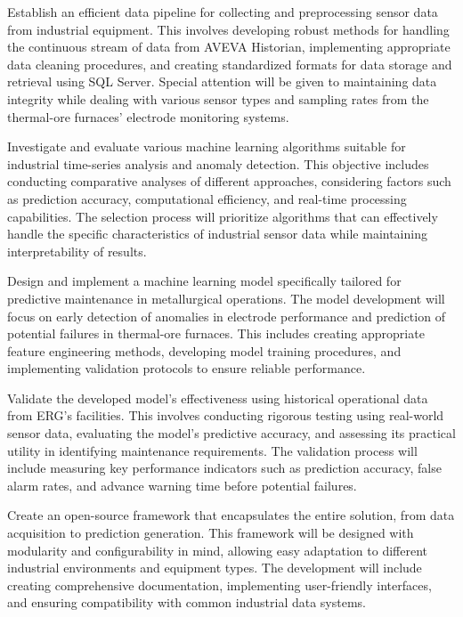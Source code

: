 Establish an efficient data pipeline for collecting and preprocessing sensor data from industrial equipment. This involves developing robust methods for handling the continuous stream of data from AVEVA Historian, implementing appropriate data cleaning procedures, and creating standardized formats for data storage and retrieval using SQL Server. Special attention will be given to maintaining data integrity while dealing with various sensor types and sampling rates from the thermal-ore furnaces' electrode monitoring systems.

Investigate and evaluate various machine learning algorithms suitable for industrial time-series analysis and anomaly detection. This objective includes conducting comparative analyses of different approaches, considering factors such as prediction accuracy, computational efficiency, and real-time processing capabilities. The selection process will prioritize algorithms that can effectively handle the specific characteristics of industrial sensor data while maintaining interpretability of results.

Design and implement a machine learning model specifically tailored for predictive maintenance in metallurgical operations. The model development will focus on early detection of anomalies in electrode performance and prediction of potential failures in thermal-ore furnaces. This includes creating appropriate feature engineering methods, developing model training procedures, and implementing validation protocols to ensure reliable performance.

Validate the developed model's effectiveness using historical operational data from ERG's facilities. This involves conducting rigorous testing using real-world sensor data, evaluating the model's predictive accuracy, and assessing its practical utility in identifying maintenance requirements. The validation process will include measuring key performance indicators such as prediction accuracy, false alarm rates, and advance warning time before potential failures.

Create an open-source framework that encapsulates the entire solution, from data acquisition to prediction generation. This framework will be designed with modularity and configurability in mind, allowing easy adaptation to different industrial environments and equipment types. The development will include creating comprehensive documentation, implementing user-friendly interfaces, and ensuring compatibility with common industrial data systems.

